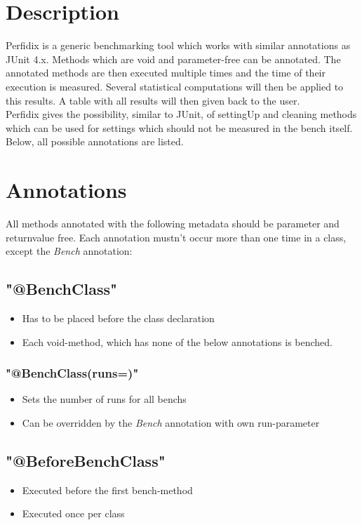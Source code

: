 \documentclass[12pt]{article}
\title{}
\author{}
\date{} %
\begin{document}
 
  \section{Description}
 Perfidix is a generic benchmarking tool which works with similar annotations as JUnit 4.x. Methods which are void and parameter-free can be annotated. The annotated methods are then executed multiple times and the time of their execution is measured. Several statistical computations will then be applied to this results. A table with all results will then given back to the user. \\
 Perfidix gives the possibility, similar to JUnit, of settingUp and cleaning methods which can be used for settings which should not be measured in the bench itself. Below, all possible annotations are listed.
 \section{Annotations}
All methods annotated with the following metadata should be parameter and returnvalue free. Each annotation mustn't occur more than one time in a class, except the \emph{Bench} annotation:
\subsection{"@BenchClass"}
\begin{itemize}
\item Has to be placed before the class declaration
\item Each void-method, which has none of the below annotations is benched.
\end{itemize}
\subsubsection{"@BenchClass(runs=)"}
\begin{itemize}
\item Sets the number of runs for all benchs
\item Can be overridden by the \emph{Bench} annotation with own run-parameter
\end{itemize}
\subsection{"@BeforeBenchClass"}
\begin{itemize}
\item Executed before the first bench-method
\item Executed once per class
\end{itemize}
\end{document}
